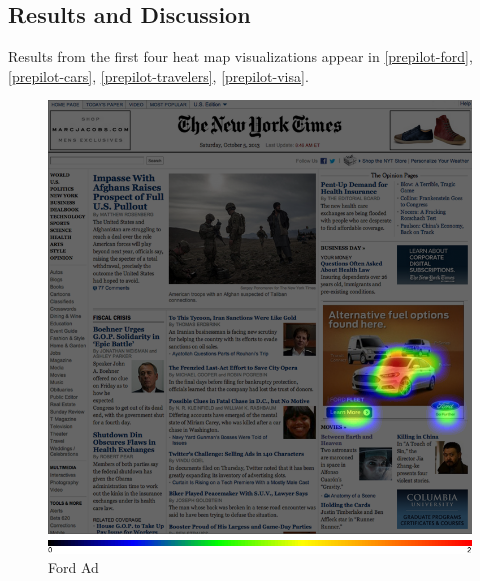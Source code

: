 \subsection{Results and Discussion}
\label{resultsanddiscussion}

Results from the first four heat map visualizations appear in  \autoref{prepilot-ford}, \autoref{prepilot-cars}, \autoref{prepilot-travelers}, \autoref{prepilot-visa}. 


\begin{figure}
\centerline{
\includegraphics[scale=.3]{chapter6.tex/ford-hotspot}
}
\caption{Ford Ad}
\label{prepilot-ford}
\end{figure}

